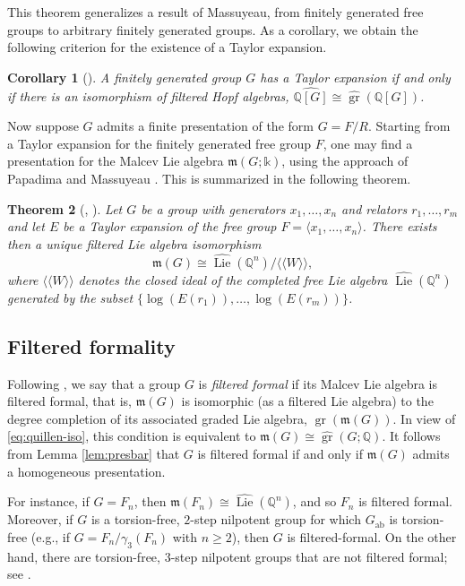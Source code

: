 \documentclass{article}
\numberwithin{equation}{section}
\newtheorem{theorem}{Theorem}[section]
\newtheorem{corollary}[theorem]{Corollary}
\theoremstyle{definition}
\newcommand{\Q}{\mathbb{Q}}
\renewcommand{\k}{\mathbb{k}}
\newcommand{\m}{{\mathfrak{m}}}
\DeclareMathOperator{\gr}{gr}
\DeclareMathOperator{\ab}{{ab}}
\DeclareMathOperator{\Lie}{Lie}
\begin{document}
This theorem generalizes a result of Massuyeau, %
from finitely generated free groups to arbitrary finitely generated groups.  
As a corollary, we obtain the following criterion for the existence 
of a Taylor expansion.

\begin{corollary}[\cite{SW-ejm}]
\label{cor:te}
A finitely generated group $G$ has a Taylor expansion if and only if 
there is an isomorphism of filtered Hopf algebras,  
$\widehat{\Q[G]}\cong\widehat{\gr}(\Q[G])$.
\end{corollary}

Now suppose $G$ admits a finite presentation of the form $G=F/R$. 
Starting from a Taylor expansion for the finitely generated free group $F$, 
one may find a presentation for the Malcev Lie algebra 
$\m(G;\k)$, using the approach of Papadima \cite{Papadima95} and 
Massuyeau \cite{Massuyeau12}. This is summarized in the following theorem.

\begin{theorem}[\cite{Massuyeau12}, \cite{Papadima95}]
\label{thm:Massuyeau}
Let $G$ be a group with generators $x_1,\dots,x_n$ and relators $r_1,\dots, r_m$ 
and let $E$ be a Taylor expansion of the free group $F=\langle x_1,\dots,x_n\rangle$.
There exists then a unique filtered Lie algebra isomorphism
\[
\m(G) \cong\widehat{\Lie}(\Q^n)/
\langle\!\langle W\rangle\!\rangle,
\]
where $\langle\!\langle W \rangle\!\rangle$ denotes 
the closed ideal of the completed free Lie algebra $\widehat{\Lie}(\Q^n)$ generated 
by the subset $\{\log(E(r_1)),\dots,\log(E(r_m))\}$. 
\end{theorem}

\subsection{Filtered formality}
\label{subsec:tff}

Following \cite{SW-forum}, we say that a group $G$ is {\em filtered formal}\/ if 
its Malcev Lie algebra is filtered formal, that is, $\m(G)$ is isomorphic (as a 
filtered Lie algebra) to the degree completion of its associated graded Lie 
algebra, $\gr(\m(G))$. In view of \eqref{eq:quillen-iso}, this condition is 
equivalent to $\m(G)\cong \widehat{\gr}(G;\Q)$. It follows from 
Lemma \ref{lem:presbar} that $G$ is filtered formal if and only if 
$\m(G)$ admits a homogeneous presentation. 

For instance, if $G=F_n$, then $\m(F_n)\cong \widehat{\Lie}(\Q^n)$, and so 
$F_n$ is filtered formal. Moreover, if $G$ is a torsion-free, $2$-step 
nilpotent group for which $G_{\ab}$ is torsion-free 
(e.g., if $G=F_n/\gamma_3(F_n)$ with $n\ge 2$), 
then $G$ is filtered-formal. On the other hand, there are torsion-free, $3$-step 
nilpotent groups that are not filtered formal; see \cite{SW-forum}.
\end{document}
